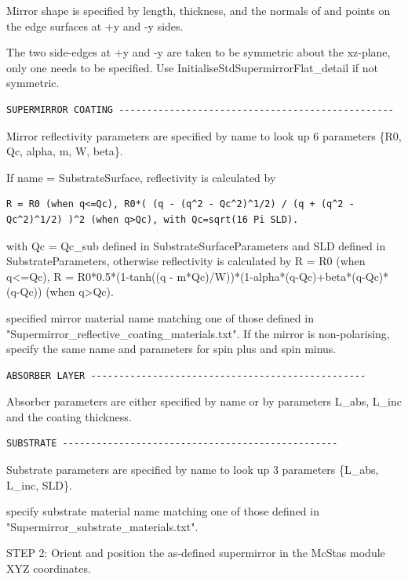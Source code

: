 Mirror shape is specified by length, thickness, and the normals of and points on the edge surfaces at +y and -y sides.

The two side-edges at +y and -y are taken to be symmetric about the xz-plane, only one needs to be specified. Use InitialiseStdSupermirrorFlat\_detail if not symmetric.

\begin{verbatim}
SUPERMIRROR COATING -------------------------------------------------
\end{verbatim}

Mirror reflectivity parameters are specified by name to look up 6 parameters \{R0, Qc, alpha, m, W, beta\}.

If name = SubstrateSurface, reflectivity is calculated by

\begin{verbatim}
R = R0 (when q<=Qc), R0*( (q - (q^2 - Qc^2)^1/2) / (q + (q^2 - Qc^2)^1/2) )^2 (when q>Qc), with Qc=sqrt(16 Pi SLD).
\end{verbatim}

with Qc = Qc\_sub defined in SubstrateSurfaceParameters and SLD defined in SubstrateParameters, otherwise reflectivity is calculated by R = R0 (when q\textless{}=Qc), R = R0*0.5*(1-tanh((q - m*Qc)/W))*(1-alpha*(q-Qc)+beta*(q-Qc)*(q-Qc)) (when q\textgreater{}Qc).

specified mirror material name matching one of those defined in "Supermirror\_reflective\_coating\_materials.txt". If the mirror is non-polarising, specify the same name and parameters for spin plus and spin minus.

\begin{verbatim}
ABSORBER LAYER -------------------------------------------------
\end{verbatim}

Absorber parameters are either specified by name or by parameters L\_abs, L\_inc and the coating thickness.

\begin{verbatim}
SUBSTRATE -------------------------------------------------
\end{verbatim}

Substrate parameters are specified by name to look up 3 parameters \{L\_abs, L\_inc, SLD\}.

specify substrate material name matching one of those defined in "Supermirror\_substrate\_materials.txt".

STEP 2: Orient and position the as-defined supermirror in the McStas module XYZ coordinates.

